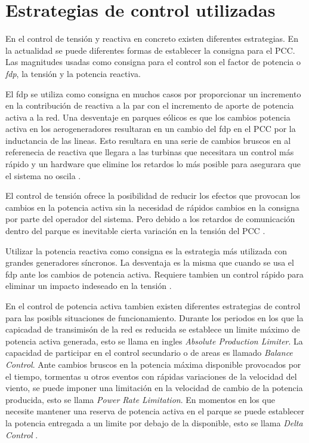 \documentclass{book}
\begin{document}
	\section{Estrategias de control utilizadas}


En el control de tensi\'on y reactiva en concreto existen diferentes estrategias. En la actualidad se puede diferentes formas de establecer la consigna para el PCC. Las magnitudes usadas como consigna para el control son el factor de potencia o \emph{fdp}, la tensi\'on y la potencia reactiva. \par

El fdp se utiliza como consigna en muchos casos por proporcionar un incremento en la contribuci\'on de reactiva a la par con el incremento de aporte de potencia activa a la red. Una desventaje en parques e\'olicos es que los cambios potencia activa en los aerogeneradores resultaran en un cambio del fdp en el PCC por la inductancia de las lineas. Esto resultara en una serie de cambios bruscos en al referenecia de reactiva que llegara a las turbinas que necesitara un control m\'as r\'apido y un hardware que elimine los retardos lo m\'as posible para asegurara que el sistema no oscila \cite{SPControl}.

El control de tensi\'on ofrece la posibilidad de reducir los efectos que provocan los cambios en la potencia activa sin la necesidad de r\'apidos cambios en la consigna por parte del operador del sistema. Pero debido a los retardos de comunicaci\'on dentro del parque es inevitable cierta variaci\'on en la tensi\'on del PCC \cite{SPControl}. \par

Utilizar la potencia reactiva como consigna es la estrategia m\'as utilizada  con grandes generadores s\'incronos. La desventaja es la misma que cuando se usa el fdp ante los cambios de potencia activa. Requiere tambien un control r\'apido para eliminar un impacto indeseado en la tensi\'on \cite{SPControl}. \par

En el control de potencia activa tambien existen diferentes estrategias de control para las posibls situaciones de funcionamiento. Durante los periodos en los que la capicadad de transimis\'on de la red es reducida se establece un limite m\'aximo de potencia activa generada, esto se llama en ingles \emph{Absolute Production Limiter}. La capacidad de participar en el control secundario o de areas es llamado \emph{Balance Control}. Ante cambios bruscos en la potencia m\'axima disponible provocados por el tiempo, tormentas u otros eventos con r\'apidas variaciones de la velocidad del viento, se puede imponer una limitaci\'on en la velocidad de cambio de la potencia producida, esto se llama \emph{Power Rate Limitation}. En momentos en los que necesite mantener una reserva de potencia activa en el parque se puede establecer la potencia entregada a un limite por debajo de la disponible, esto se llama \emph{Delta Control}  \cite{ActiveStrategies}. \par
\end{document}
